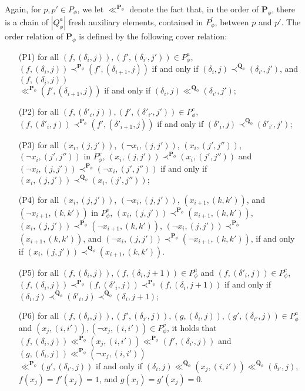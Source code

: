 \documentclass[usletter]{article}
\newcommand{\longversion}[1]{#1}
\newcommand{\pp}{\mathbf{P}}
\newcommand{\qq}{\mathbf{Q}}
\begin{document}
Again, for $p,p' \in P_{\phi}$, we let $\ll^{\pp_{\phi}}$ 
denote the fact that, in the order of $\pp_{\phi}$, 
there is a chain of $|Q^a_{\phi}|$ fresh auxiliary elements, contained in $P_{\phi}^l$, between $p$ and $p'$.   
The order relation of $\pp_{\phi}$ is defined by the following 
cover relation:
\begin{itemize}
\item[(P1)] for all $(f,(\delta_i,j)),(f',(\delta_{i'},{j'})) \in P_{\phi}^a$, 
$(f,(\delta_i,j)) \prec^{\pp_{\phi}} (f',(\delta_{i+1},{j}))$ 
if and only if 
$(\delta_i,j) \prec^{\qq_{\phi}} (\delta_{i'},{j'})$, 
and 
$(f,(\delta_i,j)) $\\
$\ll^{\pp_{\phi}} (f',(\delta_{i+1},{j}))$ 
if and only if 
$(\delta_i,j) \ll^{\qq_{\phi}} (\delta_{i'},{j'})$;

\item[(P2)] for all $(f,(\delta'_i,j)),(f',(\delta'_{i'},{j'})) \in P_{\phi}^c$, 
$(f,(\delta'_i,j)) \prec^{\pp_{\phi}} (f',(\delta'_{i+1},{j}))$ if and only if $(\delta'_i,j) \prec^{\qq_{\phi}} (\delta'_{i'},{j'})$;

\item[(P3)] for all $(x_i,(j,j'))$, $(\neg x_i,(j,j'))$, $(x_i,(j',j''))$, $(\neg x_i,(j',j''))$ in $P_{\phi}^v$, 
$(x_i,(j,j')) \prec^{\pp_{\phi}} (x_i,(j',j''))$ and 
$(\neg x_i,(j,j')) \prec^{\pp_{\phi}} (\neg x_i,(j',j''))$ 
if and only if $(x_i,(j,j')) \prec^{\qq_{\phi}} (x_i,(j',j''))$; 

\item[(P4)] for all $(x_i,(j,j'))$, $(\neg x_i,(j,j'))$, $(x_{i+1},(k,k'))$, and\\ $(\neg x_{i+1},(k,k'))$ in $P_{\phi}^v$, 
$(x_i,(j,j'))\longversion{\!} \prec^{\pp_{\phi}}\longversion{\!}(x_{i+1},(k,k'))$,  
$(x_i,(j,j'))\longversion{\!} \prec^{\pp_{\phi}}\longversion{\!}(\neg x_{i+1},(k,k'))$,  
$(\neg x_{i},(j,j')) \prec^{\pp_{\phi}}$\\
$(x_{i+1},(k,k'))$, 
and $(\neg x_{i},(j,j')) \prec^{\pp_{\phi}}(\neg x_{i+1},(k,k'))$, 
if and only if $(x_i,(j,j')) \prec^{\qq_{\phi}} (x_{i+1},(k,k'))$.

\item[(P5)] for all $(f,(\delta_i,j)), (f,(\delta_i,j+1)) \in P_{\phi}^a$ and $(f,(\delta'_i,j)) \in P_{\phi}^c$, 
$(f,(\delta_i,j)) \prec^{\pp_{\phi}} (f,(\delta'_i,j)) \prec^{\pp_{\phi}} (f,(\delta_i,j+1))$
if and only if 
$(\delta_i,j) \prec^{\qq_{\phi}} (\delta'_i,j) \prec^{\qq_{\phi}} (\delta_i,j+1)$;

\item[(P6)] for all 
$(f,(\delta_i,j)),(f',(\delta_{i'},j)),(g,(\delta_i,j)),(g',(\delta_{i'},j)) \in P_{\phi}^a$ 
and $(x_j,(i,i')),(\neg x_j,(i,i')) \in P_{\phi}^v$, it holds that 
$(f,(\delta_i,j)) \ll^{\pp_{\phi}} (x_j,(i,i')) \ll^{\pp_{\phi}} (f',(\delta_{i'},j))$ 
and $(g,(\delta_i,j)) \ll^{\pp_{\phi}} (\neg x_j,(i,i'))$\\$ \ll^{\pp_{\phi}} (g',(\delta_{i'},j))$ 
if and only if
$(\delta_i,j) \ll^{\qq_{\phi}} (x_j,(i,i')) \ll^{\qq_{\phi}} (\delta_{i'},j)$, 
$f(x_j)=f'(x_j)=1$, and $g(x_j)=g'(x_j)=0$.  
\end{itemize}
\end{document}

